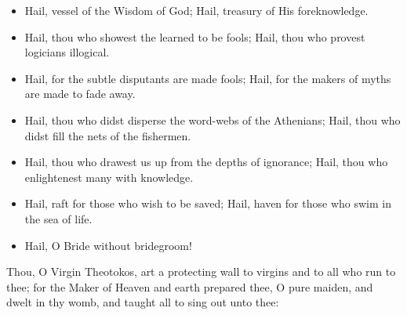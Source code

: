 \documentclass[twoside, letterpaper, 12pt]{report}
\begin{document}
\begin{itemize}[label=\tiny{+},leftmargin=*]
\item Hail, vessel of the Wisdom of God;
      Hail, treasury of His foreknowledge.
\item Hail, thou who showest the learned to be fools;
      Hail, thou who provest logicians illogical.
\item Hail, for the subtle disputants are made fools;
      Hail, for the makers of myths are made to fade away.
\item Hail, thou who didst disperse the word-webs of the Athenians;
      Hail, thou who didst fill the nets of the fishermen.
\item Hail, thou who drawest us up from the depths of ignorance;
      Hail, thou who enlightenest many with knowledge.
\item Hail, raft for those who wish to be saved;
      Hail, haven for those who swim in the sea of life.
\item Hail, O Bride without bridegroom!
\end{itemize}








\begin{reader}
  \item Thou, O Virgin Theotokos,
  art a protecting wall to virgins and to all who run to thee;
  for the Maker of Heaven and earth prepared thee, O pure maiden, and dwelt in thy
  womb, and taught all to sing out unto thee:
\end{reader}
\end{document}
